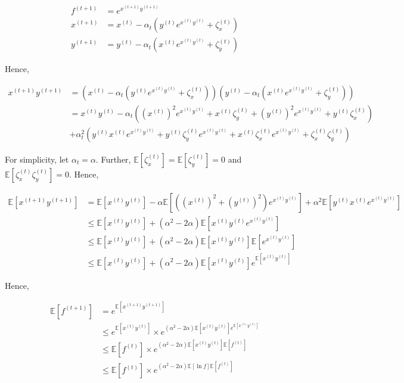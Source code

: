 \documentclass{article}
\begin{document}
\begin{align*}
    f^{(t + 1)} &= e^{x^{(t + 1)} y^{(t + 1)}} \\
    x^{(t + 1)} &= x^{(t)} - \alpha_t \left(y^{(t)}e^{x^{(t)}y^{(t)}} + \zeta_x^{(t)}\right) \\
    y^{(t + 1)} &= y^{(t)} - \alpha_t \left(x^{(t)}e^{x^{(t)}y^{(t)}} + \zeta_y^{(t)}\right)
\end{align*}

Hence, 

\begin{align*}
    x^{(t + 1)} y^{(t + 1)} &= \left(x^{(t)} - \alpha_t \left(y^{(t)}e^{x^{(t)}y^{(t)}} + \zeta_x^{(t)}\right)\right)\left(y^{(t)} - \alpha_t \left(x^{(t)}e^{x^{(t)}y^{(t)}} + \zeta_y^{(t)}\right)\right) \\
    &= x^{(t)}y^{(t)} - \alpha_t \left((x^{(t)})^2e^{x^{(t)}y^{(t)}} + x^{(t)}\zeta_y^{(t)} + (y^{(t)})^2e^{x^{(t)}y^{(t)}} + y^{(t)}\zeta_x^{(t)}\right) \\
    &+ \alpha_t^2 \left(y^{(t)}x^{(t)}e^{x^{(t)}y^{(t)}} + y^{(t)}\zeta_y^{(t)}e^{x^{(t)}y^{(t)}} + x^{(t)}\zeta_x^{(t)}e^{x^{(t)}y^{(t)}} + \zeta_x^{(t)}\zeta_y^{(t)}\right)
\end{align*}

For simplicity, let $\alpha_t = \alpha$. Further, $\mathbb{E}[\zeta_x^{(t)}] = \mathbb{E}[\zeta_y^{(t)}] = 0$ and $\mathbb{E}[\zeta_x^{(t)}\zeta_y^{(t)}] = 0$. Hence,

\begin{align*}
    \mathbb{E}[x^{(t + 1)} y^{(t + 1)}] &= \mathbb{E}[x^{(t)}y^{(t)}] -\alpha \mathbb{E}[\left((x^{(t)})^2 + (y^{(t)})^2\right) e^{x^{(t)}y^{(t)}}] + \alpha^2 \mathbb{E}[y^{(t)}x^{(t)}e^{x^{(t)}y^{(t)}}] \\
    &\leq \mathbb{E}[x^{(t)}y^{(t)}] + (\alpha^2 - 2\alpha) \mathbb{E}[x^{(t)}y^{(t)} e^{x^{(t)}y^{(t)}}] \\
    &\leq \mathbb{E}[x^{(t)}y^{(t)}] + (\alpha^2 - 2\alpha) \mathbb{E}[x^{(t)}y^{(t)}] \mathbb{E}[e^{x^{(t)}y^{(t)}}] \\
    &\leq \mathbb{E}[x^{(t)}y^{(t)}] + (\alpha^2 - 2\alpha) \mathbb{E}[x^{(t)}y^{(t)}] e^{\mathbb{E}[x^{(t)}y^{(t)}]} 
\end{align*}

Hence,

\begin{align*}
    \mathbb{E}[f^{(t + 1)}] &= e^{\mathbb{E}[x^{(t + 1)}y^{(t + 1)}]} \\
    &\leq e^{\mathbb{E}[x^{(t)}y^{(t)}]} \times e^{(\alpha^2 - 2\alpha) \mathbb{E}[x^{(t)}y^{(t)}] e^{\mathbb{E}[x^{(t)}y^{(t)}]}} \\
    &\leq \mathbb{E}[f^{(t)}] \times e^{(\alpha^2 - 2\alpha) \mathbb{E}[x^{(t)}y^{(t)}] \mathbb{E}[f^{(t)}]} \\
    &\leq \mathbb{E}[f^{(t)}] \times e^{(\alpha^2 - 2\alpha) \mathbb{E}[\ln f]\mathbb{E}[f^{(t)}]}
\end{align*}
\end{document}
